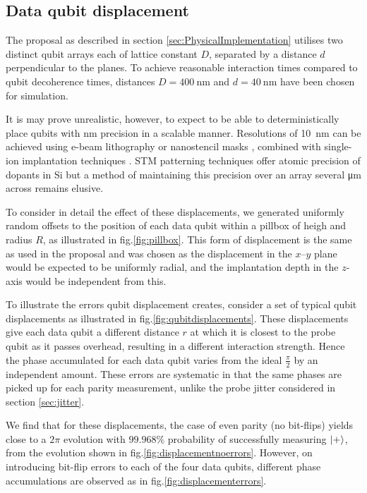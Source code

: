 
\subsection{Data qubit displacement}
The proposal \cite{OGorman2016} as described in section \ref{sec:PhysicalImplementation} utilises two distinct qubit arrays each of lattice constant $D$, separated by a distance $d$ perpendicular to the planes. To achieve reasonable interaction times compared to qubit decoherence times, distances $D = \SI{400}{\nano\metre}$ and $d = \SI{40}{\nano\metre}$ have been chosen for simulation.

It is may prove unrealistic, however, to expect to be able to deterministically place qubits with \si{\nano\metre} precision in a scalable manner. Resolutions of \SI{10}{\nano\metre} can be achieved using e-beam lithography \cite{Vieu2000a} or nanostencil masks \cite{Weis2008}, combined with single-ion implantation techniques \cite{Jamieson2005}. STM patterning techniques offer atomic precision of dopants in Si \cite{Schofield2003} but a method of maintaining this precision over an array several \si{\micro\metre} across remains elusive. 

To consider in detail the effect of these displacements, we generated uniformly random offsets to the position of each data qubit within a pillbox of heigh and radius $R$, as illustrated in fig.\@ \ref{fig:pillbox}. This form of displacement is the same as used in the proposal \cite{OGorman2016} and was chosen as the displacement in the $x$--$y$ plane would be expected to be uniformly radial, and the implantation depth in the $z$-axis would be independent from this.

To illustrate the errors qubit displacement creates, consider a set of typical qubit displacements as illustrated in fig.\@ \ref{fig:qubitdisplacements}. These displacements give each data qubit a different distance $r$ at which it is closest to the probe qubit as it passes overhead, resulting in a different interaction strength. Hence the phase accumulated for each data qubit varies from the ideal $\tfrac{\pi}{2}$ by an independent amount. These errors are systematic in that the same phases are picked up for each parity measurement, unlike the probe jitter considered in section \ref{sec:jitter}.

We find that for these displacements, the case of even parity (no bit-flips) yields close to a $2\pi$ evolution with $99.968\%$ probability of successfully measuring $\ket{+}$, from the evolution shown in fig.\@ \ref{fig:displacementnoerrors}. However, on introducing bit-flip errors to each of the four data qubits, different phase accumulations are observed as in fig.\@ \ref{fig:displacementerrors}.


